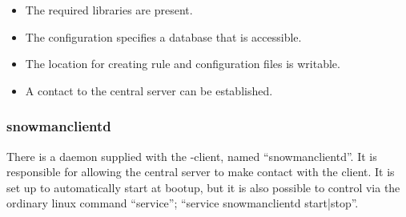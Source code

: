 \begin{itemize}
  \item The required libraries are present.
  \item The configuration specifies a database that is accessible.
  \item The location for creating \snort{} rule and configuration files is
  writable.
  \item A contact to the central server can be established.
\end{itemize}

\subsubsection{snowmanclientd}
There is a daemon supplied with the \snowman{}-client, named
``snowmanclientd''. It is responsible for allowing the central server to make
contact with the client. It is set up to automatically start at bootup, but it
is also possible to control via the ordinary linux command ``service'';
``service snowmanclientd start|stop''.
